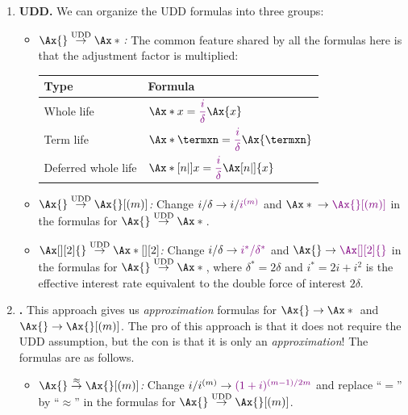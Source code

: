 \begin{enumerate}
\item \label{it:udd-relate-insurance} \textbf{UDD.} We can organize the UDD
formulas into three groups:
\begin{itemize}
\item \emph{\(\Ax{}\overset{\text{UDD}}{\to}\Ax*{}\):} The common feature
shared by all the formulas here is that the adjustment factor 
is multiplied:
\begin{center}
\begin{tabular}{ll}
\toprule
Type&Formula \\
\midrule
Whole life&\(\displaystyle \Ax*{x}=\vc{\frac{i}{\delta}}\Ax{x}\) \\
Term life&\(\displaystyle \Ax*{\termxn}=\vc{\frac{i}{\delta}}\Ax{\termxn}\) \\
Deferred whole life&\(\displaystyle \Ax*[n|]{x}=\vc{\frac{i}{\delta}}\Ax[n|]{x}\) \\
\bottomrule
\end{tabular}
\end{center}
\item \emph{\(\Ax{}\overset{\text{UDD}}{\to}\Ax{}[(m)]\):} Change \(i/\delta\to
i/{\color{violet}i^{(m)}}\) and \(\Ax*{}\to \vc{\Ax{}[(m)]}\) in the formulas for
\(\Ax{}\overset{\text{UDD}}{\to}\Ax*{}\).
\item \emph{\(\Ax[][2]{}\overset{\text{UDD}}{\to}\Ax*[][2]{}\):} Change
\(i/\delta\to {\color{violet}i^{*}/\delta^*}\) and \(\Ax{}\to \vc{\Ax[][2]{}}\) in the
formulas for \(\Ax{}\overset{\text{UDD}}{\to}\Ax*{}\),
where \(\delta^*=2\delta\) and \(i^*=2i+i^2\) is the effective interest rate
equivalent to the double force of interest \(2\delta\).
\end{itemize}
\item \label{it:claims-acc} \textbf{.} This
approach gives us \emph{approximation} formulas for \(\Ax{}\to\Ax*{}\) and
\(\Ax{}\to\Ax{}[(m)]\). The pro  of this approach is
that it does not require the UDD assumption, but the con
 is that it is only an \emph{approximation}! The
formulas are as follows.
\begin{itemize}
\item \emph{\(\Ax{}\overset{\approx}{\to}\Ax{}[(m)]\):} Change \(i/i^{(m)}\to
{\color{violet}(1+i)^{(m-1)/2m}}\) and replace ``\(=\)'' by ``\(\approx\)'' in the
formulas for \(\Ax{}\overset{\text{UDD}}{\to}\Ax{}[(m)]\).


\end{itemize}
\end{enumerate}
